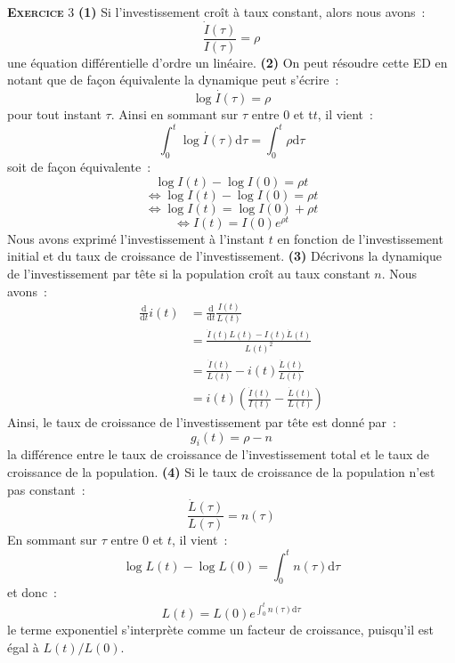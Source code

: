 \documentclass[10pt,a4paper,notitlepage]{report}
\newcommand{\exercice}[1]{\textsc{\textbf{Exercice}} #1}
\newcommand{\question}[1]{\textbf{(#1)}}
\begin{document}
\exercice{3} \question{1}  Si l'investissement croît à  taux constant,
alors nous avons :
\[
\frac{\dot{I}(\tau)}{I(\tau)} = \rho
\]
une équation différentielle d'ordre  un linéaire. \question{2} On peut
résoudre cette ED en notant que de façon équivalente la dynamique peut
s'écrire :
\[
\dot{\log I(\tau)} = \rho
\]
pour tout instant $\tau$. Ainsi en sommant sur $\tau$ entre 0 et t$t$,
il vient :
\[
\int_0^t \dot{\log I(\tau)}\mathrm d\tau = \int_0^t \rho \mathrm d\tau
\]
soit de façon équivalente :
\[
\log I(t) - \log I(0) = \rho t
\]
\[
\Leftrightarrow \log I(t) - \log I(0) = \rho t
\]
\[
\Leftrightarrow \log I(t)  = \log I(0)+\rho t
\]
\[
\Leftrightarrow I(t)  = I(0)e^{\rho t}
\]
Nous avons  exprimé l'investissement  à l'instant  $t$ en  fonction de
l'investissement    initial   et    du   taux    de   croissance    de
l'investissement.    \question{3}    Décrivons   la    dynamique    de
l'investissement par tête si la population croît au taux constant $n$.
Nous avons :
\[
\begin{split}
  \frac{\mathrm d}{\mathrm dt}i(t) &= \frac{\mathrm d}{\mathrm dt}\frac{I(t)}{L(t)}\\  
  &= \frac{\dot{I}(t)L(t)-I(t)\dot{L}(t)}{L(t)^2}\\
  &= \frac{\dot{I}(t)}{L(t)}-i(t)\frac{\dot{L}(t)}{L(t)}\\
  &= i(t)\left(\frac{\dot{I}(t)}{I(t)}-\frac{\dot{L}(t)}{L(t)}\right)
\end{split}
\]
Ainsi, le taux de croissance de l'investissement par tête est donné par : 
\[
g_i(t) =  \rho-n
\]
la différence entre le taux de croissance de l'investissement total et le taux de croissance de la 
population. \question{4} Si le taux de croissance de la population n'est pas constant :
\[
\frac{\dot{L}(\tau)}{L(\tau)} = n(\tau)
\]
En sommant sur $\tau$ entre 0 et $t$, il vient :
\[
\log L(t) - \log L(0) = \int_0^t n(\tau)\mathrm d\tau 
\]
et donc :
\[
L(t) = L(0)e^{\int_0^t n(\tau)\mathrm d\tau}
\]
le terme exponentiel s'interprète comme un facteur de croissance, puisqu'il est égal à $L(t)/L(0)$.

\bigskip
\bigskip
\end{document}
